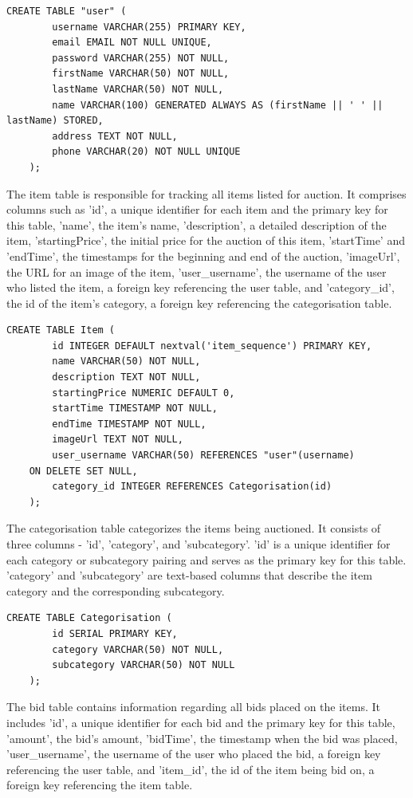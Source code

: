 \begin{lstlisting}[style=sqlStyle]
	CREATE TABLE "user" (
		username VARCHAR(255) PRIMARY KEY,
		email EMAIL NOT NULL UNIQUE,
		password VARCHAR(255) NOT NULL,
		firstName VARCHAR(50) NOT NULL,
		lastName VARCHAR(50) NOT NULL,
		name VARCHAR(100) GENERATED ALWAYS AS (firstName || ' ' || lastName) STORED,
		address TEXT NOT NULL,
		phone VARCHAR(20) NOT NULL UNIQUE
	);
\end{lstlisting}

The item table is responsible for tracking all items listed for auction. It comprises columns such as 'id', a unique identifier for each item and the primary key for this table, 'name', the item's name, 'description', a detailed description of the item, 'startingPrice', the initial price for the auction of this item, 'startTime' and 'endTime', the timestamps for the beginning and end of the auction, 'imageUrl', the URL for an image of the item, 'user\_username', the username of the user who listed the item, a foreign key referencing the user table, and 'category\_id', the id of the item's category, a foreign key referencing the categorisation table.

\begin{lstlisting}[style=sqlStyle]
	CREATE TABLE Item (
		id INTEGER DEFAULT nextval('item_sequence') PRIMARY KEY,
		name VARCHAR(50) NOT NULL,
		description TEXT NOT NULL,
		startingPrice NUMERIC DEFAULT 0,
		startTime TIMESTAMP NOT NULL,
		endTime TIMESTAMP NOT NULL,
		imageUrl TEXT NOT NULL,
		user_username VARCHAR(50) REFERENCES "user"(username)
	ON DELETE SET NULL,
		category_id INTEGER REFERENCES Categorisation(id)
	);
\end{lstlisting}

The categorisation table categorizes the items being auctioned. It consists of three columns - 'id', 'category', and 'subcategory'. 'id' is a unique identifier for each category or subcategory pairing and serves as the primary key for this table. 'category' and 'subcategory' are text-based columns that describe the item category and the corresponding subcategory.

\begin{lstlisting}[style=sqlStyle]
	CREATE TABLE Categorisation (
		id SERIAL PRIMARY KEY,
		category VARCHAR(50) NOT NULL,
		subcategory VARCHAR(50) NOT NULL
	);
\end{lstlisting}

The bid table contains information regarding all bids placed on the items. It includes 'id', a unique identifier for each bid and the primary key for this table, 'amount', the bid's amount, 'bidTime', the timestamp when the bid was placed, 'user\_username', the username of the user who placed the bid, a foreign key referencing the user table, and 'item\_id', the id of the item being bid on, a foreign key referencing the item table.

